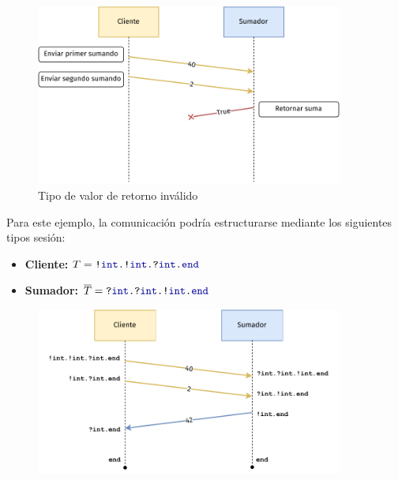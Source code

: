 \begin{frame}{\insertsubsection}
	\begin{figure}
		\centering
		\includegraphics[width=0.9\textwidth]{images/sum-diagram-type-violation.pdf}
		\caption{Tipo de valor de retorno inválido}
	\end{figure}
\end{frame}

\begin{frame}{\insertsubsection}
	Para este ejemplo, la comunicación podría estructurarse mediante los siguientes tipos sesión:
	\begin{itemize}
		\item \textbf{Cliente:} $\SessionType = \Out\tint{ \Out\tint{ \In\tint\End } }$
		\item \textbf{Sumador:} $\dual\SessionType = \In\tint{ \In\tint{ \Out\tint\End } }$
	\end{itemize}

	\begin{figure}
		\centering
		\includegraphics[width=0.9\textwidth]{images/sum-diagram-st.pdf}
	\end{figure}
\end{frame}

\begin{frame}{\insertsubsection}
	\SumClient
	\SumServer
\end{frame}
\begin{frame}{\insertsubsection}
	\SumExample
\end{frame}
